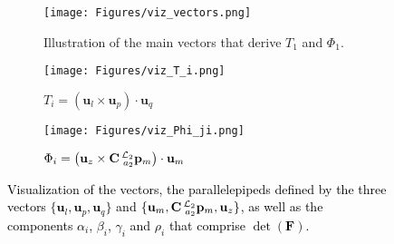\documentclass[journal]{IEEEtran}
\def\AlignedPosTarg{\mathbf{C} \prescript{\mathcal{L}_2}{a_2}{\mathbf{p}}} %
\def\FIM{\mathbf{F}}
\def\detF{\det(\FIM)}
\def\UnitZ{\mathbf{u}_z}
\begin{document}
\begin{figure}[t]
    \begin{subfigure}[t]{\linewidth}
    \centering
    \texttt{[image: Figures/viz\_vectors.png]}
    \caption{Illustration of the main vectors that derive $T_1$ and $\Phi_1$.}
    \label{fig:viz_vectors}
    \end{subfigure}
    \begin{subfigure}[t]{.48\linewidth}
    \centering
    \texttt{[image: Figures/viz\_T\_i.png]}
    \caption{$T_i = 
    (\mathbf{u}_l \times  \mathbf{u}_p) 
    \cdot 
    \mathbf{u}_q$}
    \label{fig:viz_T_i}
    \end{subfigure}
    \hfill
    \begin{subfigure}[t]{.48\linewidth}
    \centering
    \texttt{[image: Figures/viz\_Phi\_ji.png]}
    \caption{$\Phi_i = 
            \left( \UnitZ \times \AlignedPosTarg_m \right) 
            \cdot \mathbf{u}_m$}
    \label{fig:viz_Phi_ji}
    \end{subfigure}
    \caption{\textcolor{black}{Visualization of the vectors, the parallelepipeds defined by the three vectors $\{\mathbf{u}_l,\mathbf{u}_p,\mathbf{u}_q\}$ and  $\{\mathbf{u}_m,\AlignedPosTarg_m,\UnitZ\}$, as well as the components $\alpha_i$, $\beta_i$, $\gamma_i$ and $\rho_i$ that comprise $\detF$.}}
    \label{fig:analytical_coord_systems}
\end{figure}
\end{document}
